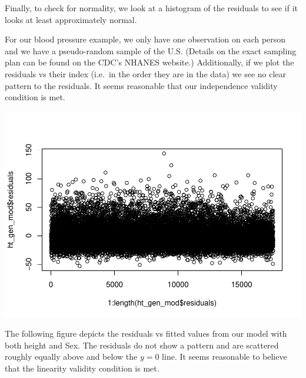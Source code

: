 \documentclass[]{book}
\newenvironment{Shaded}{\begin{snugshade}}{\end{snugshade}}
\newcommand{\DecValTok}[1]{\textcolor[rgb]{0.00,0.00,0.81}{#1}}
\newcommand{\KeywordTok}[1]{\textcolor[rgb]{0.13,0.29,0.53}{\textbf{#1}}}
\newcommand{\NormalTok}[1]{#1}
\newcommand{\OperatorTok}[1]{\textcolor[rgb]{0.81,0.36,0.00}{\textbf{#1}}}
\begin{document}
Finally, to check for normality, we look at a histogram of the residuals to see if it looks at least approximately normal.

For our blood pressure example, we only have one observation on each person and we have a pseudo-random sample of the U.S. (Details on the exact sampling plan can be found on the CDC's NHANES website.) Additionally, if we plot the residuals vs their index (i.e.~in the order they are in the data) we see no clear pattern to the residuals. It seems reasonable that our independence validity condition is met.

\begin{Shaded}
\end{Shaded}

\includegraphics{MA206supplement_files/figure-latex/unnamed-chunk-7-1.pdf}

The following figure depicts the residuals vs fitted values from our model with both height and Sex. The residuals do not show a pattern and are scattered roughly equally above and below the \(y = 0\) line. It seems reasonable to believe that the linearity validity condition is met.

\begin{Shaded}
\end{Shaded}
\end{document}
